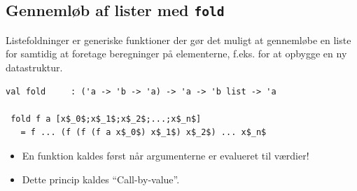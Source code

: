 \documentclass[rgb]{beamer}
\begin{document}
\subsection{Gennemløb af lister med \lstinline{fold}}

\begin{frame}[fragile]
\begin{footnotesize}


  \vspace{1ex}

  Listefoldninger er generiske funktioner der gør det muligt at
  gennemløbe en liste for samtidig at foretage beregninger på
  elementerne, f.eks. for at opbygge en ny datastruktur.

  \vspace{1ex}

\begin{lstlisting}[numbers=none,frame=none,mathescape]
val fold     : ('a -> 'b -> 'a) -> 'a -> 'b list -> 'a

 fold f a [x$_0$;x$_1$;x$_2$;...;x$_n$]
   = f ... (f (f (f a x$_0$) x$_1$) x$_2$) ... x$_n$
\end{lstlisting}

\begin{itemize}
\item En funktion kaldes først når argumenterne er evalueret til værdier!
\item Dette princip kaldes ``Call-by-value''.
\end{itemize}

\end{footnotesize}
\end{frame}
\end{document}
